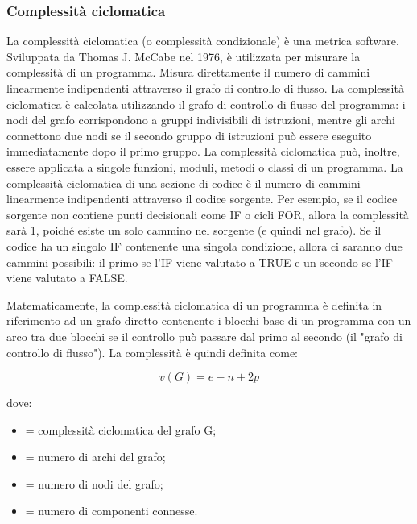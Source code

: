 \subsubsection{Complessità ciclomatica}
La complessità ciclomatica (o complessità condizionale) è una metrica software. Sviluppata da Thomas J. McCabe nel 1976, è utilizzata per misurare la complessità di un programma. Misura direttamente il numero di cammini linearmente indipendenti attraverso il grafo di controllo di flusso.
La complessità ciclomatica è calcolata utilizzando il grafo di controllo di flusso del programma: i nodi del grafo corrispondono a gruppi indivisibili di istruzioni, mentre gli archi connettono due nodi se il secondo gruppo di istruzioni può essere eseguito immediatamente dopo il primo gruppo. La complessità ciclomatica può, inoltre, essere applicata a singole funzioni, moduli, metodi o classi di un programma.
La complessità ciclomatica di una sezione di codice è il numero di cammini linearmente indipendenti attraverso il codice sorgente. Per esempio, se il codice sorgente non contiene punti decisionali come IF o cicli FOR, allora la complessità sarà 1, poiché esiste un solo cammino nel sorgente (e quindi nel grafo). Se il codice ha un singolo IF contenente una singola condizione, allora ci saranno due cammini possibili: il primo se l'IF viene valutato a TRUE e un secondo se l'IF viene valutato a FALSE.


Matematicamente, la complessità ciclomatica di un programma è definita in riferimento ad un grafo diretto contenente i blocchi base di un programma con un arco tra due blocchi se il controllo può passare dal primo al secondo (il "grafo di controllo di flusso"). La complessità è quindi definita come:

$$v(G) = e - n + 2p$$

dove:
\begin{itemize}
\item {} = complessità ciclomatica del grafo G;
\item {} = numero di archi del grafo;
\item {} = numero di nodi del grafo;
\item {} = numero di componenti connesse.
\end{itemize}
